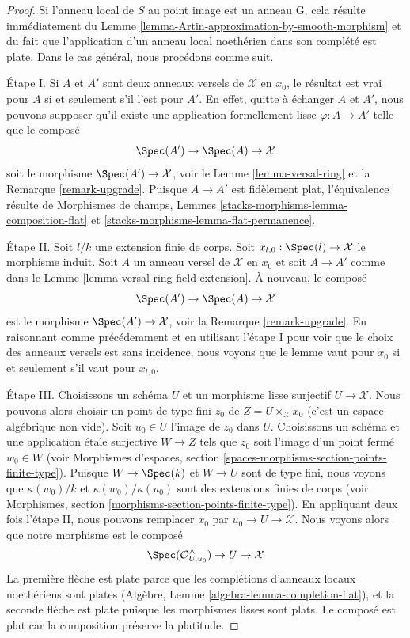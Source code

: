 \begin{proof}
Si l'anneau local de $S$ au point image est un anneau G, cela
résulte immédiatement du
Lemme \ref{lemma-Artin-approximation-by-smooth-morphism}
et du fait que l'application d'un anneau local noethérien dans son
complété est plate. Dans le cas général, nous procédons comme suit.

\medskip\noindent
Étape I. Si $A$ et $A'$ sont deux anneaux versels de $\mathcal{X}$ en $x_0$,
le résultat est vrai pour $A$ si et seulement s'il l'est pour $A'$.
En effet, quitte à échanger $A$ et $A'$, nous pouvons supposer qu'il existe
une application formellement lisse $\varphi : A \to A'$ telle que le composé
$$
\Spec(A') \to \Spec(A) \to \mathcal{X}
$$
soit le morphisme $\Spec(A') \to \mathcal{X}$, voir le
Lemme \ref{lemma-versal-ring} et la
Remarque \ref{remark-upgrade}.
Puisque $A \to A'$ est fidèlement plat, l'équivalence résulte de
Morphismes de champs, Lemmes \ref{stacks-morphisms-lemma-composition-flat} et
\ref{stacks-morphisms-lemma-flat-permanence}.

\medskip\noindent
Étape II. Soit $l/k$ une extension finie de corps. Soit
$x_{l, 0} : \Spec(l) \to \mathcal{X}$ le morphisme induit.
Soit $A$ un anneau versel de $\mathcal{X}$ en $x_0$ et
soit $A \to A'$ comme dans le Lemme \ref{lemma-versal-ring-field-extension}.
À nouveau, le composé
$$
\Spec(A') \to \Spec(A) \to \mathcal{X}
$$
est le morphisme $\Spec(A') \to \mathcal{X}$, voir la Remarque \ref{remark-upgrade}.
En raisonnant comme précédemment et en utilisant l'étape I pour voir que le choix des anneaux versels
est sans incidence, nous voyons que le lemme vaut pour $x_0$ si et seulement
s'il vaut pour $x_{l, 0}$.

\medskip\noindent
Étape III. Choisissons un schéma $U$ et un morphisme lisse surjectif
$U \to \mathcal{X}$. Nous pouvons alors choisir un point de type fini
$z_0$ de $Z = U \times_\mathcal{X} x_0$ (c'est un espace algébrique
non vide). Soit $u_0 \in U$ l'image de $z_0$ dans $U$.
Choisissons un schéma et une application étale surjective $W \to Z$
tels que $z_0$ soit l'image d'un point fermé $w_0 \in W$
(voir Morphismes d'espaces, section
\ref{spaces-morphisms-section-points-finite-type}).
Puisque $W \to \Spec(k)$ et $W \to U$ sont de type fini,
nous voyons que $\kappa(w_0)/k$ et $\kappa(w_0)/\kappa(u_0)$
sont des extensions finies de corps
(voir Morphismes, section \ref{morphisms-section-points-finite-type}).
En appliquant deux fois l'étape II, nous pouvons remplacer $x_0$ par
$u_0 \to U \to \mathcal{X}$. Nous voyons alors que notre morphisme est le composé
$$
\Spec(\mathcal{O}_{U, u_0}^\wedge) \to U \to \mathcal{X}
$$
La première flèche est plate parce que les complétions d'anneaux locaux noethériens
sont plates (Algèbre, Lemme \ref{algebra-lemma-completion-flat}),
et la seconde flèche est plate puisque
les morphismes lisses sont plats. Le composé est plat car la composition
préserve la platitude.
\end{proof}

